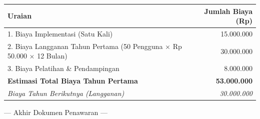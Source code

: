 \documentclass[11pt, a4paper]{article}
\begin{document}
\begin{table}[h!]
\centering
\begin{tabular}{@{} l r @{}}
\toprule
\textbf{Uraian} & \textbf{Jumlah Biaya (Rp)} \\
\midrule
1. Biaya Implementasi (Satu Kali) & 15.000.000 \\
2. Biaya Langganan Tahun Pertama (50 Pengguna $\times$ Rp 50.000 $\times$ 12 Bulan) & 30.000.000 \\
3. Biaya Pelatihan \& Pendampingan & 8.000.000 \\
\midrule
\textbf{Estimasi Total Biaya Tahun Pertama} & \textbf{53.000.000} \\
\textit{Biaya Tahun Berikutnya (Langganan)} & \textit{30.000.000} \\
\bottomrule
\end{tabular}
\end{table}

\vspace{2em}
\begin{center}
--- Akhir Dokumen Penawaran ---
\end{center}
\end{document}
